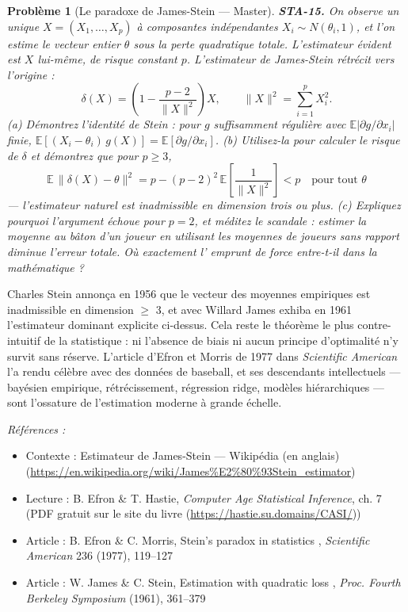 \documentclass[11pt]{article}
\newtheorem{problem}{Problème}
\newenvironment{refs}{\par\small\noindent\emph{Références :}\begin{itemize}\setlength\itemsep{0pt}}{\end{itemize}\normalsize}
\begin{document}
\bigskip

\begin{problem}[{Le paradoxe de James-Stein --- Master}]
\textbf{STA-15.} On observe un unique $ X = (X_1, \dots, X_p) $ à
composantes indépendantes $ X_i \sim N(\theta_i, 1) $, et l'on estime le vecteur entier
$ \theta $ sous la perte quadratique totale. L'estimateur évident est $ X $ lui-même, de risque
constant $ p $. L'estimateur de James-Stein rétrécit vers l'origine :
\[ \delta(X) = \left( 1 - \frac{p-2}{\lVert X \rVert^2} \right) X ,
\qquad \lVert X \rVert^2 = \sum_{i=1}^{p} X_i^2 . \]
(a) Démontrez l'identité de Stein : pour $ g $ suffisamment régulière avec
$ \mathbb{E}\left| \partial g/\partial x_i \right| $ finie,
$ \mathbb{E}[(X_i - \theta_i)\, g(X)] = \mathbb{E}[\partial g/\partial x_i] $.
(b) Utilisez-la pour calculer le risque de $ \delta $ et démontrez que pour $ p \ge 3 $,
\[ \mathbb{E}\,\lVert \delta(X) - \theta \rVert^2
 = p - (p-2)^2\, \mathbb{E}\!\left[ \frac{1}{\lVert X \rVert^2} \right] <p
\quad \text{pour tout } \theta \]
--- l'estimateur naturel est inadmissible en dimension trois ou plus.
(c) Expliquez pourquoi l'argument échoue pour $ p = 2 $, et méditez le scandale : estimer la
moyenne au bâton d'un joueur en utilisant les moyennes de joueurs sans rapport diminue l'erreur
totale. Où exactement l'\og{} emprunt de force \fg{} entre-t-il dans la mathématique ?
\end{problem}

\noindent Charles Stein annonça en 1956 que le vecteur des moyennes empiriques est
inadmissible en dimension $\ge$ 3, et avec Willard James exhiba en 1961 l'estimateur dominant explicite
ci-dessus. Cela reste le théorème le plus contre-intuitif de la statistique : ni l'absence de biais
ni aucun principe d'optimalité n'y survit sans réserve. L'article d'Efron et Morris de 1977 dans
\textit{Scientific American} l'a rendu célèbre avec des données de baseball, et ses descendants
intellectuels --- bayésien empirique, rétrécissement, régression ridge, modèles hiérarchiques --- sont
l'ossature de l'estimation moderne à grande échelle.

\begin{refs}
\item Contexte : Estimateur de James-Stein --- Wikipédia (en anglais) (\url{https://en.wikipedia.org/wiki/James%E2%80%93Stein_estimator})
\item Lecture : B. Efron \& T. Hastie, \textit{Computer Age Statistical Inference}, ch. 7 (PDF gratuit sur le site du livre (\url{https://hastie.su.domains/CASI/}))
\item Article : B. Efron \& C. Morris, \og{} Stein's paradox in statistics \fg{}, \textit{Scientific American} 236 (1977), 119--127
\item Article : W. James \& C. Stein, \og{} Estimation with quadratic loss \fg{}, \textit{Proc. Fourth Berkeley Symposium} (1961), 361--379
\end{refs}
\end{document}
